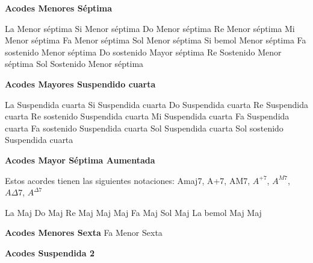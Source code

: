 \textbf{Acodes Menores S\'eptima}
\vskip 25pt

\small
\upchord{\AmsevenPiano}La Menor s\'eptima \hfill
\upchord{\BmsevenPiano}\qquad\qquad Si Menor s\'eptima \hfill
\upchord{\CmsevenPiano}Do Menor s\'eptima \hfill\null\break
\vskip 25pt
\upchord{\DmsevenPiano}Re Menor s\'eptima \hfill
\upchord{\EmsevenPiano}Mi Menor s\'eptima \hfill
\upchord{\FmsevenPiano}Fa Menor s\'eptima \hfill\null\break
\vskip 25pt
\upchord{\GmsevenPiano}Sol Menor s\'eptima \hfill
\upchord{\BflatmsevenPiano}Si bemol Menor s\'eptima \hfill
\upchord{\FsmsevenPiano}Fa sostenido Menor s\'eptima \hfill\null\break
\vskip 25pt
\upchord{\CssevenPiano}Do sostenido Mayor s\'eptima \hfill
\upchord{\DsmsevenPiano}Re Sostenido Menor s\'eptima \hfill
\upchord{\GsmsevenPiano}Sol Sostenido Menor s\'eptima \hfill\null\break
\normalsize

\vskip 20pt

\textbf{Acodes Mayores Suspendido cuarta}
\vskip 25pt

\small
\upchord{\AsusPiano}La Suspendida cuarta \hfill
\upchord{\BsusPiano}Si Suspendida cuarta \hfill
\upchord{\CsusPiano}Do Suspendida cuarta \hfill\null\break
\vskip 25pt
\upchord{\DsusPiano}Re Suspendida cuarta \hfill
\upchord{\DssusPiano}Re sostenido Suspendida cuarta \hfill
\upchord{\EsusPiano}Mi Suspendida cuarta \hfill\null\break
\vskip 25pt
\upchord{\FsusPiano}Fa Suspendida cuarta \hfill
\upchord{\FssusPiano}Fa sostenido Suspendida cuarta \hfill
\upchord{\GsusPiano}Sol Suspendida cuarta \hfill\null\break
\vskip 25pt
\upchord{\GssusPiano}Sol sostenido Suspendida cuarta \hfill\null\break
\normalsize

\vskip 20pt
\textbf{Acodes Mayor S\'eptima Aumentada}
\vskip 25pt

Estos acordes tienen las siguientes notaciones:
Amaj7, A+7, AM7, $A^{+7}$, $A^{M7}$, $A\Delta7$, $A^{\Delta7}$\break
\vskip 20pt

\small
\upchord{\AMajPiano}La Maj \hfill
\upchord{\CMajPiano}Do Maj \hfill
\upchord{\DMajPiano}Re Maj \hfill\null\break
\vskip 20pt
 Maj \hfill
{} Maj \hfill
\upchord{\FMajPiano}Fa Maj \hfill\null\break
\vskip 20pt
\upchord{\GMajPiano}Sol Maj \hfill
\upchord{\AflatMajPiano}\qquad La bemol Maj \hfill
{} Maj \hfill\null\break
\normalsize

\vskip 20pt
\textbf{Acodes Menores Sexta}
\vskip 25pt
\small
\upchord{\FmsixPiano}\qquad Fa Menor Sexta \hfill
\normalsize

\vskip 20pt
\textbf{Acodes Suspendida 2}
\vskip 25pt

